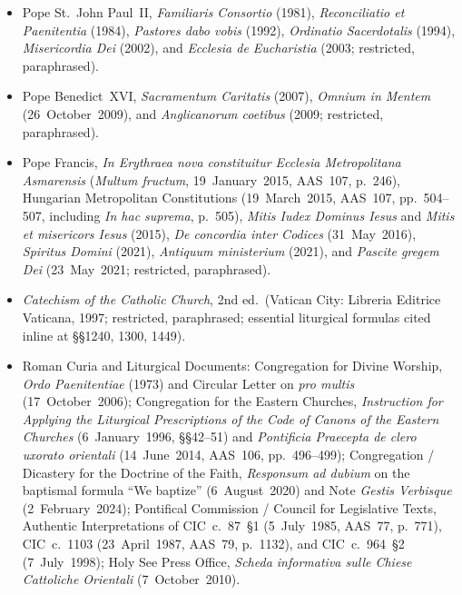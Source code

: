\begin{itemize}
\item Pope St.~John Paul~II, \emph{Familiaris Consortio} (1981), \emph{Reconciliatio et Paenitentia} (1984), \emph{Pastores dabo vobis} (1992), \emph{Ordinatio Sacerdotalis} (1994), \emph{Misericordia Dei} (2002), and \emph{Ecclesia de Eucharistia} (2003; restricted, paraphrased).
\item Pope Benedict~XVI, \emph{Sacramentum Caritatis} (2007), \emph{Omnium in Mentem} (26~October~2009), and \emph{Anglicanorum coetibus} (2009; restricted, paraphrased).
\item Pope Francis, \emph{In Erythraea nova constituitur Ecclesia Metropolitana Asmarensis} (\emph{Multum fructum}, 19~January~2015, AAS~107, p.~246), Hungarian Metropolitan Constitutions (19~March~2015, AAS~107, pp.~504--507, including \emph{In hac suprema}, p.~505), \emph{Mitis Iudex Dominus Iesus} and \emph{Mitis et misericors Iesus} (2015), \emph{De concordia inter Codices} (31~May~2016), \emph{Spiritus Domini} (2021), \emph{Antiquum ministerium} (2021), and \emph{Pascite gregem Dei} (23~May~2021; restricted, paraphrased).
\item \emph{Catechism of the Catholic Church}, 2nd ed.\ (Vatican City: Libreria Editrice Vaticana, 1997; restricted, paraphrased; essential liturgical formulas cited inline at \S\S1240, 1300, 1449).
\item Roman Curia and Liturgical Documents: Congregation for Divine Worship, \emph{Ordo Paenitentiae} (1973) and Circular Letter on \emph{pro multis} (17~October~2006); Congregation for the Eastern Churches, \emph{Instruction for Applying the Liturgical Prescriptions of the Code of Canons of the Eastern Churches} (6~January~1996, \S\S42--51) and \emph{Pontificia Praecepta de clero uxorato orientali} (14~June~2014, AAS~106, pp.~496--499); Congregation / Dicastery for the Doctrine of the Faith, \emph{Responsum ad dubium} on the baptismal formula ``We baptize'' (6~August~2020) and Note \emph{Gestis Verbisque} (2~February~2024); Pontifical Commission / Council for Legislative Texts, Authentic Interpretations of CIC~c.~87~\S1 (5~July~1985, AAS~77, p.~771), CIC~c.~1103 (23~April~1987, AAS~79, p.~1132), and CIC~c.~964~\S2 (7~July~1998); Holy See Press Office, \emph{Scheda informativa sulle Chiese Cattoliche Orientali} (7~October~2010).
\end{itemize}

